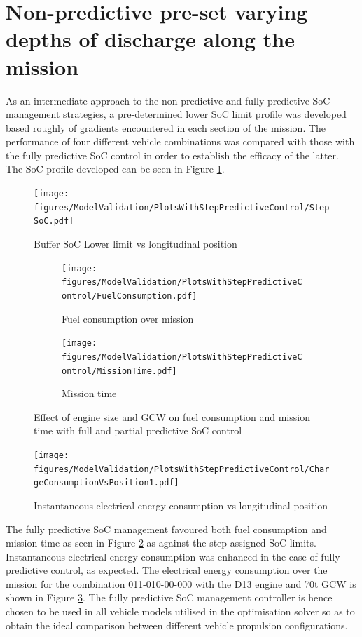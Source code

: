 \documentclass[ExampleMasters.tex]{subfiles}
\begin{document}
\section{Non-predictive pre-set varying depths of discharge along the mission}
As an intermediate approach to the non-predictive and fully predictive SoC management strategies, a pre-determined lower SoC limit profile was developed based roughly of gradients encountered in each section of the mission. The performance of four different vehicle combinations was compared with those with the fully predictive SoC control in order to establish the efficacy of the latter. The SoC profile developed can be seen in Figure \ref{stepSoC}.\\
\begin{figure}
\centering
\texttt{[image: figures/ModelValidation/PlotsWithStepPredictiveControl/StepSoC.pdf]}
\caption{Buffer SoC Lower limit vs longitudinal position}
\label{stepSoC}
\end{figure}
\begin{figure}
\begin{subfigure}{.5\textwidth}
\centering
\texttt{[image: figures/ModelValidation/PlotsWithStepPredictiveControl/FuelConsumption.pdf]}
\caption{Fuel consumption over mission}
\end{subfigure}
\begin{subfigure}{.5\textwidth}
\centering
\texttt{[image: figures/ModelValidation/PlotsWithStepPredictiveControl/MissionTime.pdf]}
\caption{Mission time}
\end{subfigure}
\caption{Effect of engine size and GCW on fuel consumption and mission time with full and partial predictive SoC control}
\label{timeFuelAxleEngineStepSoC}
\end{figure}

\begin{figure}
\centering
\texttt{[image: figures/ModelValidation/PlotsWithStepPredictiveControl/ChargeConsumptionVsPosition1.pdf]}
\caption{Instantaneous electrical energy consumption vs longitudinal position}
\label{electricalEnergyConsumptionStepSoC}
\end{figure}

The fully predictive SoC management favoured both fuel consumption and mission time as seen in Figure \ref{timeFuelAxleEngineStepSoC} as against the step-assigned SoC limits. Instantaneous electrical energy consumption was enhanced in the case of fully predictive control, as expected. The electrical energy consumption over the mission for the combination 011-010-00-000 with the D13 engine and 70t GCW is shown in Figure \ref{electricalEnergyConsumptionStepSoC}. The fully predictive SoC management controller is hence chosen to be used in all vehicle models utilised in the optimisation solver so as to obtain the ideal comparison between different vehicle propulsion configurations.
\end{document}
